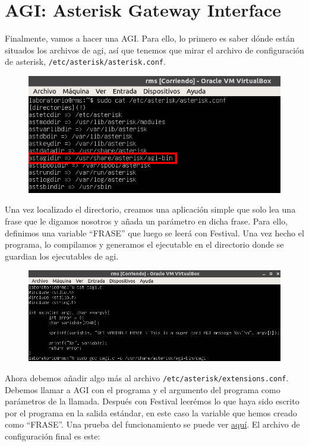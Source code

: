 \documentclass[11pt,a4paper]{article}
\begin{document}
\newpage

\section{AGI: Asterisk Gateway Interface}

Finalmente, vamos a hacer una AGI. Para ello, lo primero es saber dónde están situados los archivos de agi, así que tenemos que mirar el archivo de configuración de asterisk, \texttt{/etc/asterisk/asterisk.conf}.

\begin{figure}[H]
	\centering
	\includegraphics[scale=0.7]{img/17.png}
\end{figure}

Una vez localizado el directorio, creamos una aplicación simple que solo lea una frase que le digamos nosotros y añada un parámetro en dicha frase. Para ello, definimos una variable ``FRASE'' que luego se leerá con Festival. Una vez hecho el programa, lo compilamos y generamos el ejecutable en el directorio donde se guardian los ejecutables de agi.

\begin{figure}[H]
	\centering
	\includegraphics[scale=0.5]{img/18.png}
\end{figure}

Ahora debemos añadir algo más al archivo \texttt{/etc/asterisk/extensions.conf}. Debemos llamar a AGI con el programa y el argumento del programa como parámetros de la llamada. Después con Festival leerémos lo que haya sido escrito por el programa en la salida estándar, en este caso la variable que hemos creado como ``FRASE''. Una prueba del funcionamiento se puede ver \color{blue}\href{https://drive.google.com/open?id=1zSiYJlazfP62NacsPuGumZq_c7zl82Fp}{aquí}. \color{black} El archivo de configuración final es este:
\end{document}

